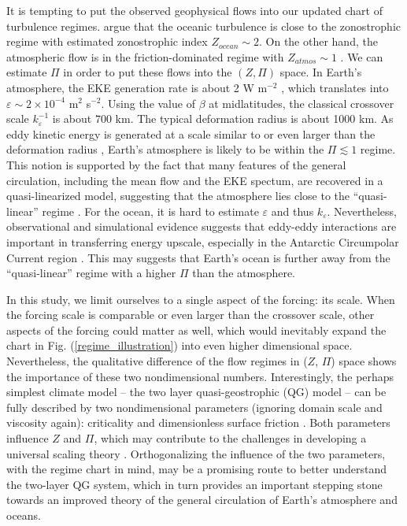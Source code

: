 \documentclass{jfm}
\begin{document}
It is tempting to put the observed geophysical flows into our updated
chart of turbulence regimes. \citet{Galperin2004} argue that the
oceanic turbulence is close to the zonostrophic regime with estimated
zonostrophic index $Z_{ocean}\sim2$. On the other hand, the atmospheric
flow is in the friction-dominated regime with $Z_{atmos}\sim1$ \citep{Galperin2010}.
We can estimate $\Pi$ in order to put these flows into the $(Z,\Pi)$
space. In Earth's atmosphere, the EKE generation rate is about
2 W m$^{-2}$ \citep{Peixoto1984,Li2007}, which translates into $\varepsilon\sim2\times10^{-4}$
m$^{2}$ s$^{-2}$. Using the value of $\beta$ at midlatitudes, the
classical crossover scale $k_{\varepsilon}^{-1}$ is about $700$
km. The typical deformation radius is about 1000 km. As eddy kinetic
energy is generated at a scale similar to or even larger than the deformation
radius \citep{Chai2014}, Earth's atmosphere is likely to be within
the $\Pi\apprle1$ regime. This notion is supported by the fact that many features
of the general circulation, including the mean flow and the EKE spectum, 
are recovered in a quasi-linearized model, suggesting that  the atmosphere lies close
to the ``quasi-linear'' regime \citep{O'Gorman2007}. For the ocean,
it is hard to estimate $\varepsilon$ and thus $k_{\varepsilon}$. 
Nevertheless, observational and simulational evidence suggests that eddy-eddy
interactions are important in transferring energy upscale, especially in the Antarctic Circumpolar 
Current region \citep{Scott2005,Tulloch2011}. This may suggests that Earth's
ocean is further away from the ``quasi-linear'' regime with a higher $\Pi$ 
than the atmosphere.

In this study, we limit ourselves to a single aspect of the forcing: its scale.
When the forcing scale is comparable or even larger than the crossover
scale, other aspects of the forcing could matter as well, which would inevitably expand
the chart in Fig. (\ref{regime_illustration}) into even higher dimensional
space. Nevertheless, the qualitative difference of the flow regimes in
($Z$, $\Pi$) space shows the importance of these two nondimensional numbers.
Interestingly, the perhaps simplest climate model -- the two layer quasi-geostrophic
(QG) model -- can be fully described by two nondimensional parameters 
(ignoring domain scale and viscosity again): criticality and 
dimensionless surface friction \citep{Phillips1956,Held2019}. Both parameters
influence $Z$ and $\Pi$, which may contribute to the challenges in developing
a universal scaling theory \citep{Lapeyre2003,Thompson2007}. 
Orthogonalizing the influence of the two parameters, with the regime chart
in mind, may be a promising route to better understand the two-layer QG
system, which in turn provides an important stepping stone towards an
improved theory of the general circulation of Earth's atmosphere and oceans.
\end{document}
